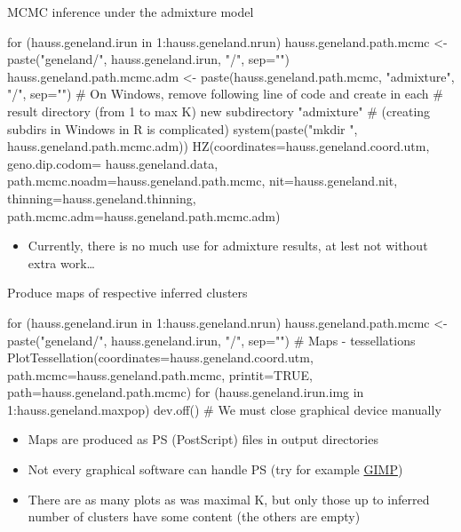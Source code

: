 \documentclass[compress, xelatex, 11pt, xcolor=svgnames, aspectratio=169,
	hyperref={
		bookmarks=true,
		unicode=true,
		colorlinks=true,
		pdftitle={Molecular data in R},
		plainpages=false,
		pdfauthor={Vojtech Zeisek},
		pdfsubject={Course about phylogeny and evolution in R},
		pdfcreator={XeLaTeX},
		pdfkeywords={R, evolution, phylogeny, molecular data},
		linkcolor=Crimson, %
		anchorcolor=Magenta, %
		citecolor=Magenta, %
		filecolor=Magenta, %
		menucolor=Magenta, %
		urlcolor=DodgerBlue, %
		},
	url={hyphens, lowtilde} %
	]{beamer}
\begin{document}
\begin{frame}[fragile]{MCMC inference under the admixture model}
	\begin{spluscode}
    for (hauss.geneland.irun in 1:hauss.geneland.nrun) {
      hauss.geneland.path.mcmc <- paste("geneland/",
        hauss.geneland.irun, "/", sep="")
      hauss.geneland.path.mcmc.adm <- paste(hauss.geneland.path.mcmc,
        "admixture", "/", sep="")
      # On Windows, remove following line of code and create in each
      # result directory (from 1 to max K) new subdirectory "admixture"
      # (creating subdirs in Windows in R is complicated)
      system(paste("mkdir ", hauss.geneland.path.mcmc.adm))
      HZ(coordinates=hauss.geneland.coord.utm, geno.dip.codom=
        hauss.geneland.data, path.mcmc.noadm=hauss.geneland.path.mcmc,
        nit=hauss.geneland.nit, thinning=hauss.geneland.thinning,
        path.mcmc.adm=hauss.geneland.path.mcmc.adm)
      }
	\end{spluscode}
	\begin{itemize}
		\item Currently, there is no much use for admixture results, at lest not without extra work\ldots
	\end{itemize}
\end{frame}

\begin{frame}[fragile]{Produce maps of respective inferred clusters}
	\begin{spluscode}
    for (hauss.geneland.irun in 1:hauss.geneland.nrun) {
      hauss.geneland.path.mcmc <- paste("geneland/",
        hauss.geneland.irun, "/", sep="")
      # Maps - tessellations
      PlotTessellation(coordinates=hauss.geneland.coord.utm,
        path.mcmc=hauss.geneland.path.mcmc, printit=TRUE,
        path=hauss.geneland.path.mcmc)
      for (hauss.geneland.irun.img in 1:hauss.geneland.maxpop) {
        dev.off() } # We must close graphical device manually
      }
	\end{spluscode}
	\begin{itemize}
		\item Maps are produced as PS (PostScript) files in output directories
		\item Not every graphical software can handle PS (try for example \href{https://www.gimp.org/}{GIMP})
		\item There are as many plots as was maximal K, but only those up to inferred number of clusters have some content (the others are empty)
	\end{itemize}
\end{frame}
\end{document}
